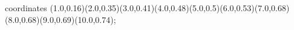 					coordinates { (1.0,0.16)(2.0,0.35)(3.0,0.41)(4.0,0.48)(5.0,0.5)(6.0,0.53)(7.0,0.68)(8.0,0.68)(9.0,0.69)(10.0,0.74)};